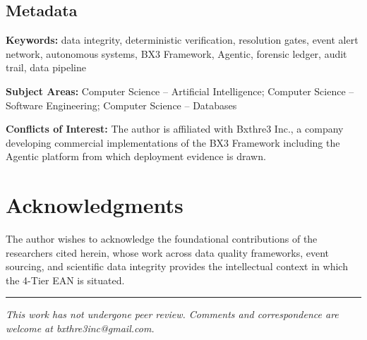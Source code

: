 \documentclass[12pt]{article}
\begin{document}
\subsection*{Metadata}

\textbf{Keywords:} data integrity, deterministic verification, resolution gates, event alert network, autonomous systems, BX3 Framework, Agentic, forensic ledger, audit trail, data pipeline

\textbf{Subject Areas:} Computer Science -- Artificial Intelligence; Computer Science -- Software Engineering; Computer Science -- Databases

\textbf{Conflicts of Interest:} The author is affiliated with Bxthre3 Inc., a company developing commercial implementations of the BX3 Framework including the Agentic platform from which deployment evidence is drawn.

\section*{Acknowledgments}

The author wishes to acknowledge the foundational contributions of the researchers cited herein, whose work across data quality frameworks, event sourcing, and scientific data integrity provides the intellectual context in which the 4-Tier EAN is situated.




\vspace{2em}
\hrule
\vspace{0.5em}
\noindent\small\textit{This work has not undergone peer review. Comments and correspondence are welcome at bxthre3inc@gmail.com.}
\end{document}

